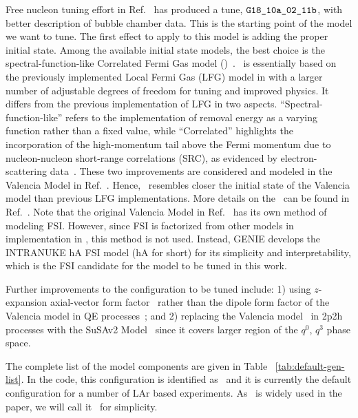 Free nucleon tuning effort in Ref.~\cite{GENIE:2021zuu} has produced a tune, $\texttt{G18\_10a\_02\_11b}$, with better description of bubble chamber data. 
This is the starting point of the model we want to tune. 
The first effect to apply to this model is adding the proper initial state. 
Among the available \genie initial state models, the best choice is the spectral-function-like Correlated Fermi Gas model (\sfcfg)~\cite{sfcfg-talk,sfcfg-GitHubCommit,GENIE:2021npt}. 
\sfcfg\ is essentially based on the previously implemented Local Fermi Gas (LFG) model in \genie with a larger number of adjustable degrees of freedom for tuning and improved physics. 
It differs from the previous implementation of LFG in two aspects. 
``Spectral-function-like'' refers to the implementation of removal energy as a varying function rather than a fixed value, while ``Correlated'' highlights the incorporation of the high-momentum tail above the Fermi momentum due to nucleon-nucleon short-range correlations (SRC), as evidenced by electron-scattering data~\cite{PhysRevLett.96.082501}.
These two improvements are considered and modeled in the Valencia Model in Ref.~\cite{Nieves:2004wx}.
Hence, \sfcfg\ resembles closer the initial state of the Valencia model than previous LFG implementations.
More details on the \sfcfg\ can be found in Ref.~\cite{GENIE:2021npt}. 
Note that the original Valencia Model in Ref.~\cite{Nieves:2004wx} has its own method of modeling FSI. 
However, since FSI is factorized from other models in implementation in \genie, this method is not used.
Instead, GENIE develops the INTRANUKE hA FSI model (hA for short) for its simplicity and interpretability, which is the FSI candidate for the model to be tuned in this work.

Further improvements to the configuration to be tuned include: 1) using $z$-expansion axial-vector form factor~\cite{Hill:2010yb} rather than the dipole form factor of the Valencia model in QE processes~\cite{Nieves:2004wx}; and 2) replacing the Valencia model~\cite{Nieves:2011pp} in 2p2h processes with the SuSAv2 Model~\cite{Gonzalez-Jimenez:2014eqa} since it covers larger region of the $q^0$, $q^3$ phase space.

The complete list of the model components are given in Table ~\ref{tab:default-gen-list}. 
In the \genie code, this configuration is identified as \newtune\ and it is currently the default \genie configuration for a number of LAr based experiments. 
As \newtune\ is widely used in the paper, we will call it \gZero\ for simplicity. 

